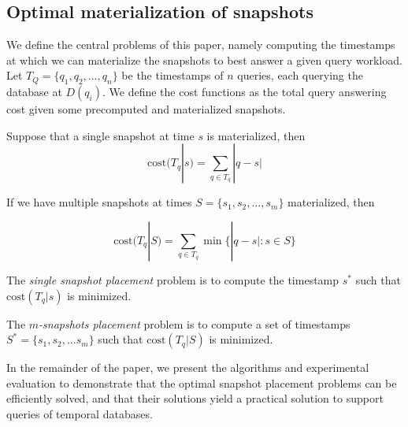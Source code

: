 \subsection{Optimal materialization of snapshots}

We define the central problems of this paper, namely computing the timestamps at
which we can materialize the snapshots to best answer a given query workload.
Let $T_Q = \{q_1, q_2, \dots, q_n\}$ be the timestamps of $n$ queries, each 
querying the database at $D(q_i)$.  We define the cost functions as the total
query answering cost given some precomputed and materialized snapshots.

\begin{definition}
    Suppose that a single snapshot at time $s$ is materialized, then
    $$\mathrm{cost}(T_q | s) = \sum_{q\in T_q} |q - s|$$

    If we have multiple snapshots at times $S=\{s_1, s_2, \dots, s_m\}$
    materialized, then

    $$\mathrm{cost}(T_q|S) = \sum_{q\in T_q} \min\{|q-s| : s\in S\}$$
\end{definition}

\begin{definition}
    The {\em single snapshot placement} problem is
    to compute the timestamp $s^*$ such that $\mathrm{cost}(T_q | s)$ is
    minimized.

    The {\em $m$-snapshots placement} problem is
    to compute a set of timestamps $S^* = \{s_1, s_2, \dots s_m\}$
    such that $\mathrm{cost}(T_q | S)$ is minimized.
\end{definition}

In the remainder of the paper, we present the algorithms and experimental
evaluation to demonstrate that the optimal snapshot placement problems can be
efficiently solved, and that their solutions yield a practical solution to
support queries of temporal databases.
